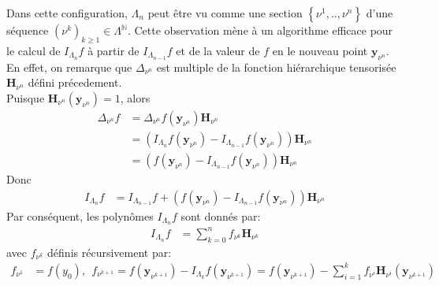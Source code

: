 
\vspace{0.5cm}
Dans cette configuration, $\Lambda_n$ peut être vu comme une section $\left \{ \nu^1, .. , \nu^n \right \}$ d'une séquence
$(\nu^k)_{k \geq 1} \in \Lambda^{\mathbb{N}}$. Cette observation mène à un algorithme efficace pour le calcul de
$I_{\Lambda_n}f$ à partir de $I_{\Lambda_{n-1}}f$ et de la valeur de $f$ en le nouveau point $\textbf{y}_{\nu^n}$. En effet,
on remarque que $\Delta_{\nu^n}$ est multiple de la fonction hiérarchique tensorisée $\textbf{H}_{\nu^n}$ défini précedement.\\
Puisque $\textbf{H}_{\nu^n}(\textbf{y}_{\nu^n}) = 1$, alors \\
\begin{align}
	 \Delta_{\nu^n}f &= \Delta_{\nu^n} f(\textbf{y}_{\nu^n}) \textbf{H}_{\nu^n} \\
	 &= (I_{\Lambda_n}f(\textbf{y}_{\nu^n}) - I_{\Lambda_{n-1}}f(\textbf{y}_{\nu^n})) \textbf{H}_{\nu^n} \\
	 &= (f(\textbf{y}_{\nu^n}) - I_{\Lambda_{n-1}}f(\textbf{y}_{\nu^n})) \textbf{H}_{\nu^n}
\end{align}
Donc
\begin{align}
	 I_{\Lambda_n}f & = I_{\Lambda_{n-1}}f + (f(\textbf{y}_{\nu^n}) - I_{\Lambda_{n-1}}f(\textbf{y}_{\nu^n})) \textbf{H}_{\nu^n}
\end{align}
Par conséquent, les polynômes $I_{\Lambda_n}f$ sont donnés par:
\begin{align}
	 I_{\Lambda_n}f & = \sum_{k=0}^n f_{\nu^k} \textbf{H}_{\nu^k}
\end{align}
avec $f_{\nu^k}$ définis récursivement par:
\begin{align}
	 f_{\nu^1} & = f(y_0),\ \ f_{\nu^{k+1}} = f(\textbf{y}_{\nu^{k+1}}) - I_{\Lambda_{k}}f(\textbf{y}_{\nu^{k+1}}) = f(\textbf{y}_{\nu^{k+1}}) - \sum_{i=1}^k f_{\nu^i} \textbf{H}_{\nu^i}(\textbf{y}_{\nu^{k+1}})
\end{align}

